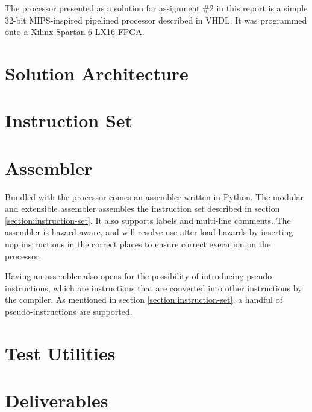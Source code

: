 The processor presented as a solution for assignment \#2 in this report is a simple 32-bit MIPS-inspired pipelined processor described in VHDL.
It was programmed onto a Xilinx Spartan-6 LX16 FPGA.

\section{Solution Architecture}



\newpage
\section{Instruction Set}
\label{section:instruction-set}

 \label{sec:instruction-set}

\section{Assembler}

Bundled with the processor comes an assembler written in Python.
The modular and extensible assembler assembles the instruction set described in section \vref{section:instruction-set}.
It also supports labels and multi-line comments.
The assembler is hazard-aware, and will resolve use-after-load hazards by inserting nop instructions in the correct places to ensure correct execution on the processor.

Having an assembler also opens for the possibility of introducing pseudo-instructions, which are instructions that are converted into other instructions by the compiler.
As mentioned in section \vref{section:instruction-set}, a handful of pseudo-instructions are supported.

\section{Test Utilities}



\section{Deliverables}


